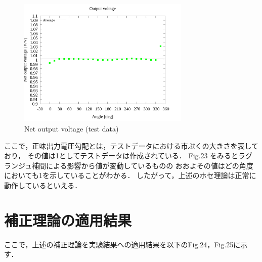 \documentclass[twocolumn,a4j]{jsarticle}
\begin{document}
\begin{figure}[htbp]
    \footnotesize
    \begin{center}
        \includegraphics[width=82mm]{../../../02_workspace/result/simulation_tx=10.0_ty=-5.0_dx=5.00_dy=-2.50/plot/09/09_summary-outputvoltage-net.png}
        \caption{Net output voltage (test data)}
    \end{center}
\end{figure}

\newpage

ここで，正味出力電圧勾配とは，テストデータにおける市ぷくの大きさを表しており，
その値は1としてテストデータは作成されている．
Fig.23 をみるとラグランジュ補間による影響から値が変動しているものの
おおよその値はどの角度においても1を示していることがわかる．
したがって，上述のホセ理論は正常に動作しているといえる．

\section{補正理論の適用結果}

ここで，上述の補正理論を実験結果への適用結果を以下のFig.24，Fig.25に示す．
\end{document}
